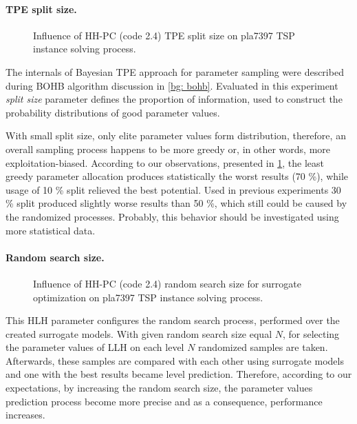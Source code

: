 \paragraph{TPE split size.}
\begin{figure}[b]
	\centering
	\vspace{-10pt}
	
	\caption{Influence of HH-PC (code 2.4) TPE split size on pla7397 TSP instance solving process.}
	\vspace{-5pt}
	\label{eval:2:pict:tpe split size}
\end{figure}
The internals of Bayesian TPE approach for parameter sampling were described during BOHB algorithm discussion in \cref{bg: bohb}. Evaluated in this experiment \emph{split size} parameter defines the proportion of information, used to construct the probability distributions of good parameter values. 

With small split size, only elite parameter values form distribution, therefore, an overall sampling process happens to be more greedy or, in other words, more exploitation-biased. According to our observations, presented in \cref{eval:2:pict:tpe split size}, the least greedy parameter allocation produces statistically the worst results (70 \%), while usage of 10 \% split relieved the best potential. Used in previous experiments 30 \% split produced slightly worse results than 50 \%, which still could be caused by the randomized processes. Probably, this behavior should be investigated using more statistical data.

\paragraph{Random search size.}
\begin{figure}[h]
	\centering
	\vspace{-10pt}
	
	\caption{Influence of HH-PC (code 2.4) random search size for surrogate optimization on pla7397 TSP instance solving process.}
	\vspace{-5pt}
	\label{eval:2:pict: random search size}
\end{figure}
This HLH parameter configures the random search process, performed over the created surrogate models. With given random search size equal $N$, for selecting the parameter values of LLH on each level $N$ randomized samples are taken. Afterwards, these samples are compared with each other using surrogate models and one with the best results became level prediction. Therefore, according to our expectations, by increasing the random search size, the parameter values prediction process become more precise and as a consequence, performance increases.

